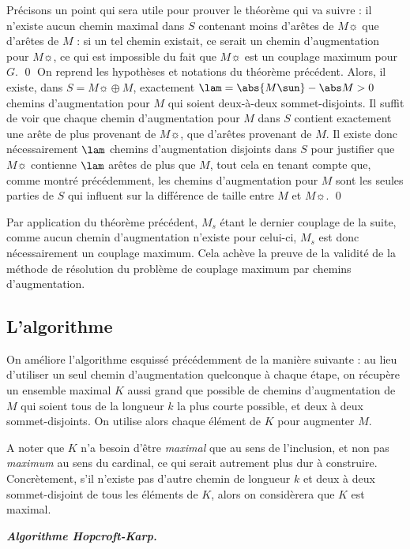     Précisons un point qui sera utile pour prouver le théorème qui va suivre : il n'existe aucun chemin maximal dans $S$ contenant moins d'arêtes de $M\sun$ que d'arêtes de $M$ : si un tel chemin existait, ce serait un chemin d'augmentation pour $M\sun$, ce qui est impossible du fait que $M\sun$ est un couplage maximum pour $G$.
 \qed\SEP
  On reprend les hypothèses et notations du théorème précédent. Alors, il existe, dans $S = M\sun \oplus M$, exactement $\lam = \abs {M\sun} - \abs M > 0$ chemins d'augmentation pour $M$ qui soient deux-à-deux sommet-disjoints.
 \SEP\jpreuve
    Il suffit de voir que chaque chemin d'augmentation pour $M$ dans $S$ contient exactement une arête de plus provenant de $M\sun$, que d'arêtes provenant de $M$. Il existe donc nécessairement $\lam$ chemins d'augmentation disjoints dans $S$ pour justifier que $M\sun$ contienne $\lam$ arêtes de plus que $M$, tout cela en tenant compte que, comme montré précédemment, les chemins d'augmentation pour $M$ sont les seules parties de $S$ qui influent sur la différence de taille entre $M$ et $M\sun$.
 \qed \SEP
 
 Par application du théorème précédent, $M_s$ étant le dernier couplage de la suite, comme aucun chemin d'augmentation n'existe pour celui-ci, $M_s$ est donc nécessairement un couplage maximum. Cela achève la preuve de la validité de la méthode de résolution du problème de couplage maximum par chemins d'augmentation.
 
 \subsection{L'algorithme}
 
 On améliore l'algorithme esquissé précédemment de la manière suivante : au lieu d'utiliser un seul chemin d'augmentation quelconque à chaque étape, on récupère un ensemble maximal $K$ aussi grand que possible de chemins d'augmentation de $M$ qui soient tous de la longueur $k$ la plus courte possible, et deux à deux sommet-disjoints. On utilise alors chaque élément de $K$ pour augmenter $M$.
 
 A noter que $K$ n'a besoin d'être \emph{maximal} que au sens de l'inclusion, et non pas \emph{maximum} au sens du cardinal, ce qui serait autrement plus dur à construire. Concrètement, s'il n'existe pas d'autre chemin de longueur $k$ et deux à deux sommet-disjoint de tous les éléments de $K$, alors on considèrera que $K$ est maximal.
 
 
 \SEP \emph{\bfseries Algorithme Hopcroft-Karp.}
    

